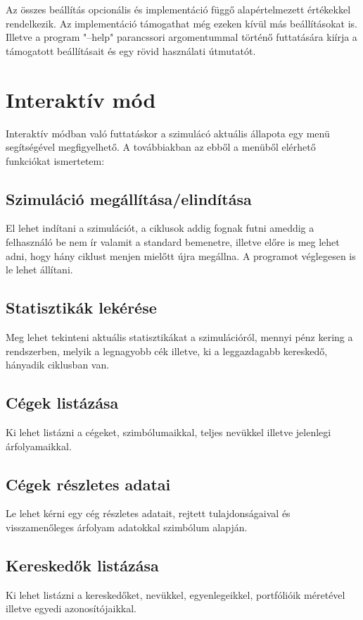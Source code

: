 \documentclass{article}[12pt,a4paper]
\begin{document}
    Az összes beállítás opcionális és implementáció függő alapértelmezett értékekkel rendelkezik.
    Az implementáció támogathat még ezeken kívül más beállításokat is.
    Illetve a program "--help" parancssori argomentummal történő futtatására kiírja a támogatott beállításait és egy rövid használati útmutatót.


    \section{Interaktív mód}
    Interaktív módban való futtatáskor a szimulácó aktuális állapota egy menü segítségével megfigyelhető.
    A továbbiakban az ebből a menüből elérhető funkciókat ismertetem:

    \subsection{Szimuláció megállítása/elindítása}
    El lehet indítani a szimulációt, a ciklusok addig fognak futni ameddig a felhasználó be nem ír valamit a standard bemenetre, illetve előre is meg lehet adni, hogy hány ciklust menjen mielőtt újra megállna.
    A programot véglegesen is le lehet állítani.

    \subsection{Statisztikák lekérése}
    Meg lehet tekinteni aktuális statisztikákat a szimulációról, mennyi pénz kering a rendszerben, melyik a legnagyobb cék illetve, ki a leggazdagabb kereskedő, hányadik ciklusban van.

    \subsection{Cégek listázása}
    Ki lehet listázni a cégeket, szimbólumaikkal, teljes nevükkel illetve jelenlegi árfolyamaikkal.

    \subsection{Cégek részletes adatai}
    Le lehet kérni egy cég részletes adatait, rejtett tulajdonságaival és visszamenőleges árfolyam adatokkal szimbólum alapján.

    \subsection{Kereskedők listázása}
    Ki lehet listázni a kereskedőket, nevükkel, egyenlegeikkel, portfólióik méretével illetve egyedi azonosítójaikkal.
\end{document}
